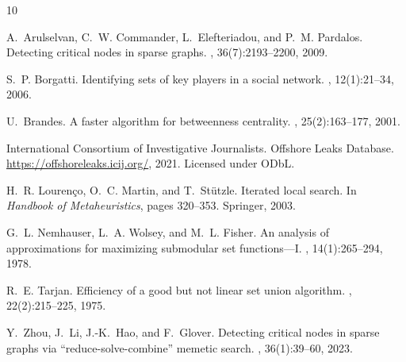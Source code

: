 \documentclass[11pt,a4paper]{article}
\begin{document}

\begin{thebibliography}{10}

A.~Arulselvan, C.~W. Commander, L.~Elefteriadou, and P.~M. Pardalos.
\newblock Detecting critical nodes in sparse graphs.
, 36(7):2193--2200, 2009.

S.~P. Borgatti.
\newblock Identifying sets of key players in a social network.
, 12(1):21--34, 2006.

U.~Brandes.
\newblock A faster algorithm for betweenness centrality.
, 25(2):163--177, 2001.

International Consortium of Investigative Journalists.
\newblock Offshore Leaks Database.
\newblock \url{https://offshoreleaks.icij.org/}, 2021.
\newblock Licensed under ODbL.

H.~R. Louren{\c{c}}o, O.~C. Martin, and T.~St{\"u}tzle.
\newblock Iterated local search.
\newblock In {\em Handbook of Metaheuristics}, pages 320--353. Springer, 2003.

G.~L. Nemhauser, L.~A. Wolsey, and M.~L. Fisher.
\newblock An analysis of approximations for maximizing submodular set functions---{I}.
, 14(1):265--294, 1978.

R.~E. Tarjan.
\newblock Efficiency of a good but not linear set union algorithm.
, 22(2):215--225, 1975.

Y.~Zhou, J.~Li, J.-K.~Hao, and F.~Glover.
\newblock Detecting critical nodes in sparse graphs via ``reduce-solve-combine'' memetic search.
, 36(1):39--60, 2023.

\end{thebibliography}
\end{document}
